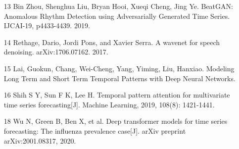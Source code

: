 \begin{itemize}
\item[13] Bin Zhou, Shenghua Liu, Bryan Hooi, Xueqi Cheng, Jing Ye. BeatGAN: Anomalous Rhythm Detection using Adversarially Generated Time Series. IJCAI-19, p4433-4439. 2019.
\item[14] Rethage, Dario, Jordi Pons, and Xavier Serra. A wavenet for speech denoising. arXiv:1706.07162. 2017.
\item[15] Lai, Guokun, Chang, Wei-Cheng, Yang, Yiming, Liu, Hanxiao. Modeling Long Term and Short Term Temporal Patterns with Deep Neural Networks.  
\item[16] Shih S Y, Sun F K, Lee H. Temporal pattern attention for multivariate time series forecasting[J]. Machine Learning, 2019, 108(8): 1421-1441.
\item[18]  Wu N, Green B, Ben X, et al. Deep transformer models for time series forecasting: The influenza prevalence case[J]. arXiv preprint arXiv:2001.08317, 2020.

\end{itemize}
